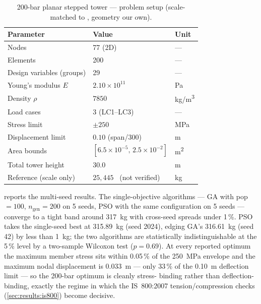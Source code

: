 \begin{table}[htbp]
  \centering
  \caption{200-bar planar stepped tower — problem setup (scale-matched to \cite{kaveh2010}, geometry our own).}
  \label{tab:results:200bar-setup}
  \begin{tabular}{lll}
    \toprule
    Parameter               & Value                  & Unit \\
    \midrule
    Nodes                   & 77 (2D)                & --- \\
    Elements                & 200                    & --- \\
    Design variables (groups)& 29                    & --- \\
    Young's modulus $E$     & $2.10 \times 10^{11}$  & Pa \\
    Density $\rho$          & $7850$                 & kg/m\textsuperscript{3} \\
    Load cases              & 3 (LC1--LC3)           & --- \\
    Stress limit            & $\pm 250$              & MPa \\
    Displacement limit      & $0.10$ (span/300)      & m \\
    Area bounds             & $[6.5\times 10^{-5},\, 2.5\times 10^{-2}]$ & m\textsuperscript{2} \\
    Total tower height      & $30.0$                 & m \\
    Reference (scale only)  & $25{,}445$~\cite{kaveh2010} (not verified) & kg \\
    \bottomrule
  \end{tabular}
\end{table}

 reports the multi-seed results. The
single-objective algorithms --- GA with pop $=100$, $n_\text{gen}
= 200$ on 5 seeds, PSO with the same configuration on 5 seeds ---
converge to a tight band around \num{317}~kg with cross-seed
spreads under \num{1}\,\%. PSO takes the single-seed best at
\num{315.89}~kg (seed 2024), edging GA's \num{316.61}~kg
(seed 42) by less than \num{1}~kg; the two algorithms are
statistically indistinguishable at the \num{5}\,\% level by a
two-sample Wilcoxon test ($p = 0.69$). At every reported optimum
the maximum member stress sits within \num{0.05}\,\% of the
250~MPa envelope and the maximum nodal displacement is
\num{0.033}~m --- only \num{33}\,\% of the \num{0.10}~m
deflection limit --- so the 200-bar optimum is cleanly stress-
binding rather than deflection-binding, exactly the regime in
which the IS~800:2007 tension/compression checks
(\cref{sec:results:is800}) become decisive.

